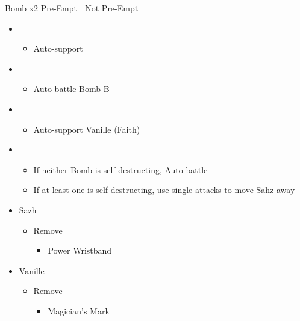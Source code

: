 \documentclass{report}
\begin{document}
\begin{battle}{Bomb x2 Pre-Empt $|$ Not Pre-Empt}
\begin{multicols}{2}
\begin{itemize}
    \item \second
    \begin{itemize}
        \item Auto-support
    \end{itemize}
    \item \first
    \begin{itemize}
        \item Auto-battle Bomb B
    \end{itemize}
\end{itemize}
\columnbreak
\begin{itemize}
    \item \second
    \begin{itemize}
        \item Auto-support Vanille (Faith)
    \end{itemize}
    \item \first
    \begin{itemize}
        \item If neither Bomb is self-destructing, Auto-battle
        \item If at least one is self-destructing, use single attacks to move Sahz away
    \end{itemize}
\end{itemize}
\end{multicols}
\end{battle}

\begin{menu}
\begin{itemize}
    \equip
    \begin{itemize}
        \item Sazh
        \begin{itemize}
            \item Remove
            \begin{itemize}
                \item Power Wristband
            \end{itemize}
        \end{itemize}
        \item Vanille
        \begin{itemize}
            \item Remove
            \begin{itemize}
                \item Magician's Mark
            \end{itemize}
        \end{itemize}
    \end{itemize}
\end{itemize}
\end{menu}
\end{document}
